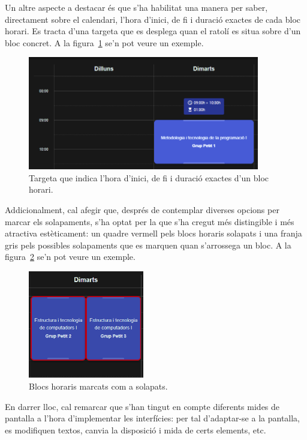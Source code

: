 \documentclass[a4paper,12pt]{ThesisStyle}
\begin{document}
Un altre aspecte a destacar és que s'ha habilitat una manera per saber, directament sobre el calendari, l'hora d'inici, de fi i duració exactes de cada bloc horari. Es tracta d'una targeta que es desplega quan el ratolí es situa sobre d'un bloc concret. A la figura~\ref{img:hourTooltip} se'n pot veure un exemple.

\begin{figure}[H]
  \centering
  \includegraphics[width=0.9\textwidth]{assets/code/usabilitat/hourTooltip.png}
  \caption{\label{img:hourTooltip} Targeta que indica l'hora d'inici, de fi i duració exactes d'un bloc horari.}
\end{figure}

Addicionalment, cal afegir que, després de contemplar diverses opcions per marcar els solapaments, s'ha optat per la que s'ha cregut més distingible i més atractiva estèticament: un quadre vermell pels blocs horaris solapats i una franja gris pels possibles solapaments que es marquen quan s'arrossega un bloc. A la figura~\ref{img:impl_solapament} se'n pot veure un exemple.

\begin{figure}[H]
  \centering
  \includegraphics[width=0.45\textwidth]{assets/code/usabilitat/solapament.png}
  \caption{\label{img:impl_solapament} Blocs horaris marcats com a solapats.}
\end{figure}

En darrer lloc, cal remarcar que s'han tingut en compte diferents mides de pantalla a l'hora d'implementar les interfícies: per tal d'adaptar-se a la pantalla, es modifiquen textos, canvia la disposició i mida de certs elements, etc.
\end{document}
